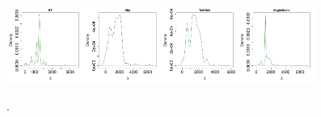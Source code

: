 \documentclass{bmcart}
\begin{document}
\begin{figure}[h!]
\caption{.}
\includegraphics[width=0.2249\textwidth]{imgs/BT-unblock-dist}\includegraphics[width=0.2249\textwidth]{imgs/Sky-unblock-dist}\includegraphics[width=0.2249\textwidth]{imgs/TalkTalk-unblock-dist}\includegraphics[width=0.2249\textwidth]{imgs/VirginMedia-unblock-dist}


\end{figure}
\end{document}

